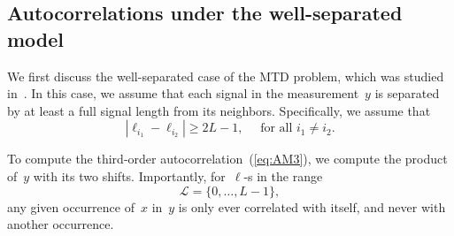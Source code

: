 \documentclass{article}
\begin{document}
\subsection{Autocorrelations under the well-separated model}
\label{subsec:relations}
We first discuss the \mbox{well-separated} case of the MTD problem, which was studied in~\cite{bendory2019multi}. In this case, we assume that each signal in the measurement~$y$ is separated by at least a full signal length from its neighbors. Specifically, we assume that
\begin{equation}
\label{eq:sep}
|\ell_{i_1} - \ell_{i_2}| \ge 2L - 1, \quad \text{ for all } i_1 \ne i_2.
\end{equation}

To compute the third-order autocorrelation~(\ref{eq:AM3}), we compute the product of~$y$ with its two shifts. Importantly, for~\mbox{$\ell$-s} in the range
\begin{equation}
\label{eq:set_L}
\mathcal{L} = \{0, \ldots, {L - 1}\},
\end{equation}
any given occurrence of~$x$ in~$y$ is only ever correlated with itself, and never with another occurrence.
\end{document}
